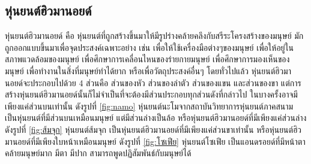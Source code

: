 \subsection{หุ่นยนต์ฮิวมานอยด์}
หุ่นยนต์ฮิวมานอยด์ คือ หุ่นยนต์ที่ถูกสร้างขึ้นมาให้มีรูปร่างคล้ายคลึงกับสรีระโครงสร้างของมนุษย์
มักถูกออกแบบขึ้นมาเพื่อจุดประสงค์เฉพาะอย่าง เช่น เพื่อให้ใช้เครื่องมือต่างๆของมนุษย์ เพื่อให้อยู่ในสภาพแวดล้อมของมนุษย์
เพื่อศึกษาการเคลื่อนไหนของร่ายกายมนุษย์ เพื่อศึกษาการมองเห็นของมนุษย์ เพื่อทำงานในสิ่งที่มนุษย์ทำได้ยาก
หรือเพื่อวัตถุประสงค์อื่นๆ โดยทั่วไปแล้ว หุ่นยนต์ฮิวมานอยด์จะประกอบไปด้วย 4 ส่วนคือ ส่วนของหัว ส่วนของลำตัว ส่วนของแขน
และส่วนของขา แต่การสร้างหุ่นยนต์ฮิวมานอยด์นั้นก็ไม่จำเป็นที่จะต้องมีส่วนประกอบทุกส่วนดังที่กล่าวไป
ในบางครั้งอาจมีเพียงแค่ส่วนบนเท่านั้น ดังรูปที่ \ref{fig:namo} หุ่นยนต์นะโมจากสถาบันวิทยาการหุ่นยนต์ภาคสนาม
เป็นหุ่นยนต์ที่มีส่วนบนเหมือนมนุษย์ แต่มีส่วนล่างเป็นล้อ หรือหุ่นยนต์ฮิวมานอยด์ที่มีเพียงแค่ส่วนล่าง ดังรูปที่ \ref{fig:ส้มจุก}
หุ่นยนต์ส้มจุก เป็นหุ่นยนต์ฮิวมานอยด์ที่มีเพียงแค่ส่วนขาเท่านั้น หรือหุ่นยนต์ฮิวมานอยด์ที่มีเพียงใบหน้าเหมือนมนุษย์ ดังรูปที่
\ref{fig:โซเฟีย} หุ่นยนต์โซเฟีย เป็นแอนดรอยด์ที่มีหน้าตาคล้ายมนุษย์มาก มีตา มีปาก สามารถพูดปฏิสัมพันธ์กับมนุษย์ได้

